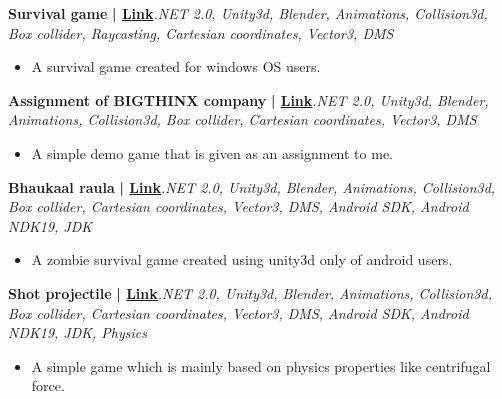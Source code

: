 \documentclass[a4paper]{article}
\begin{document}
      {\textbf{Survival game}}\textbf{ | \href{https://drive.google.com/file/d/1ZnBeZiy6eXkXYw2dBnO6opT8bSLgfQfe/view?usp=sharing}{Link}}\hfill{\sl .NET 2.0, Unity3d, Blender, Animations, Collision3d, Box collider, Raycasting, Cartesian coordinates, Vector3, DMS}\\
          \vspace{-3mm}
\begin{itemize} \itemsep -3pt
\item[] A survival game created for windows OS users.
\end{itemize}
          \vspace*{3mm}
      {\textbf{Assignment of BIGTHINX company}}\textbf{ | \href{https://drive.google.com/file/d/1Rqr5XQDzfYqUQXrFuydPsJPV8fTGfmv7/view?usp=sharing}{Link}}\hfill{\sl .NET 2.0, Unity3d, Blender, Animations, Collision3d, Box collider, Cartesian coordinates, Vector3, DMS}\\
          \vspace{-3mm}
\begin{itemize} \itemsep -3pt
\item[] A simple demo game that is given as an assignment to me.
\end{itemize}
          \vspace*{3mm}
      {\textbf{Bhaukaal raula}}\textbf{ | \href{https://drive.google.com/file/d/1Fy7XuyabrZhhgiSIgjpT1kJL8RrHQmSa/view?usp=sharing}{Link}}\hfill{\sl .NET 2.0, Unity3d, Blender, Animations, Collision3d, Box collider, Cartesian coordinates, Vector3, DMS, Android SDK, Android NDK19, JDK}\\
          \vspace{-3mm}
\begin{itemize} \itemsep -3pt
\item[] A zombie survival game created using unity3d only of android users.
\end{itemize}
          \vspace*{3mm}
      {\textbf{Shot projectile}}\textbf{ | \href{https://github.com/DarshanDEV1/Shot\_Projectile-Game-using-Unity3D}{Link}}\hfill{\sl .NET 2.0, Unity3d, Blender, Animations, Collision3d, Box collider, Cartesian coordinates, Vector3, DMS, Android SDK, Android NDK19, JDK, Physics}\\
          \vspace{-3mm}
\begin{itemize} \itemsep -3pt
\item[] A simple game which is mainly based on physics properties like centrifugal force.
\end{itemize}
\end{document}

